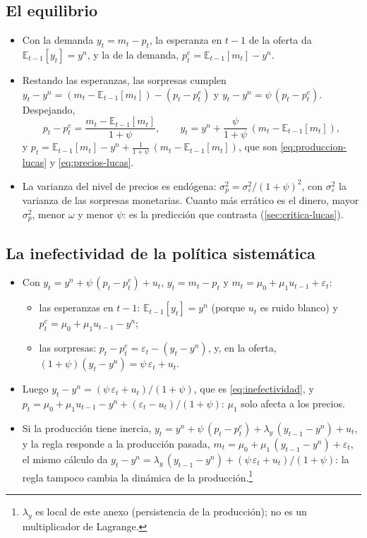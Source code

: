 \documentclass[11pt]{article}
\begin{document}
\subsection{El equilibrio}

\begin{itemize}
\item Con la demanda $y_t=m_t-p_t$, la esperanza en $t-1$ de la oferta da $\mathbb{E}_{t-1}[y_t]=y^n$, y la de la demanda, $p^e_t=\mathbb{E}_{t-1}[m_t]-y^n$.
\item Restando las esperanzas, las sorpresas cumplen $y_t-y^n=(m_t-\mathbb{E}_{t-1}[m_t])-(p_t-p^e_t)$ y $y_t-y^n=\psi\,(p_t-p^e_t)$. Despejando,
  \begin{equation*}
  p_t-p^e_t=\frac{m_t-\mathbb{E}_{t-1}[m_t]}{1+\psi},\qquad y_t=y^n+\frac{\psi}{1+\psi}\,\left(m_t-\mathbb{E}_{t-1}[m_t]\right),
  \end{equation*}
  y $p_t=\mathbb{E}_{t-1}[m_t]-y^n+\frac{1}{1+\psi}\,(m_t-\mathbb{E}_{t-1}[m_t])$, que son \eqref{eq:produccion-lucas} y \eqref{eq:precios-lucas}.
\item La varianza del nivel de precios es endógena: $\sigma^2_p=\sigma^2_\varepsilon/(1+\psi)^2$, con $\sigma^2_\varepsilon$ la varianza de las sorpresas monetarias. Cuanto más errático es el dinero, mayor $\sigma^2_p$, menor $\omega$ y menor $\psi$: es la predicción que contrasta \textcite{Lucas1973Some} (\ref{sec:critica-lucas}).
\end{itemize}
\findemo

\subsection{La inefectividad de la política sistemática}

\begin{itemize}
\item Con $y_t=y^n+\psi\,(p_t-p^e_t)+u_t$, $y_t=m_t-p_t$ y $m_t=\mu_0+\mu_1u_{t-1}+\varepsilon_t$:
  \begin{itemize}
  \item las esperanzas en $t-1$: $\mathbb{E}_{t-1}[y_t]=y^n$ (porque $u_t$ es ruido blanco) y $p^e_t=\mu_0+\mu_1u_{t-1}-y^n$;
  \item las sorpresas: $p_t-p^e_t=\varepsilon_t-(y_t-y^n)$, y, en la oferta, $(1+\psi)(y_t-y^n)=\psi\,\varepsilon_t+u_t$.
  \end{itemize}
\item Luego $y_t-y^n=(\psi\,\varepsilon_t+u_t)/(1+\psi)$, que es \eqref{eq:inefectividad}, y $p_t=\mu_0+\mu_1u_{t-1}-y^n+(\varepsilon_t-u_t)/(1+\psi)$: $\mu_1$ solo afecta a los precios.
\item Si la producción tiene inercia, $y_t=y^n+\psi\,(p_t-p^e_t)+\lambda_y\,(y_{t-1}-y^n)+u_t$, y la regla responde a la producción pasada, $m_t=\mu_0+\mu_1\,(y_{t-1}-y^n)+\varepsilon_t$, el mismo cálculo da $y_t-y^n=\lambda_y\,(y_{t-1}-y^n)+(\psi\,\varepsilon_t+u_t)/(1+\psi)$: la regla tampoco cambia la dinámica de la producción.\footnote{$\lambda_y$ es local de este anexo (persistencia de la producción); no es un multiplicador de Lagrange.\nocite{Heijdra2017Foundations}}
\end{itemize}
\findemo
\end{document}
